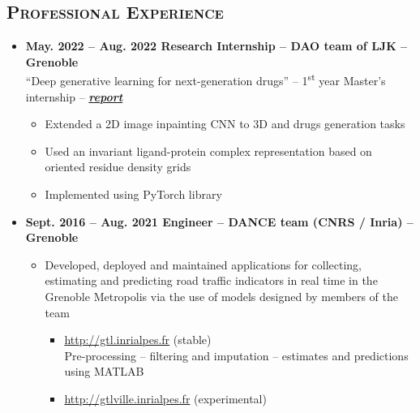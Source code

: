 \documentclass{article}
\begin{document}
\begin{minipage}{0.8\textwidth}
\begin{flushleft}
    \section*{\textsc{Professional Experience}}
    \begin{itemize}
        \item \textbf{May. 2022 – Aug. 2022 \qquad Research Internship – DAO team of LJK – Grenoble} \\
        “Deep generative learning for next-generation drugs” – 1\textsuperscript{st} year Master’s internship – \textbf{\textit{ \hyperlink{https://vadmbertr.github.io/Deep-generative-learning-for-next-generation-drugs/Internship_report___Deep_generative_learning_for_next_generation_drugs.pdf}{report}}}
        \vspace{-.15cm}
        \begin{itemize}[leftmargin=*]
        \setlength\itemsep{.01cm}
            \item Extended a 2D image inpainting CNN to 3D and drugs generation tasks
            \item Used an invariant ligand-protein complex representation based on oriented residue density grids
            \item Implemented using PyTorch library
        \end{itemize}
        \item \textbf{Sept. 2016 – Aug. 2021 \qquad Engineer – DANCE team (CNRS / Inria) – Grenoble}
        \vspace{-.15cm}
        \begin{itemize}[leftmargin=*]
        \setlength\itemsep{.01cm}
            \item Developed, deployed and maintained applications for collecting, estimating and predicting road traffic indicators in real time in the Grenoble Metropolis via the use of models designed by members of the team
            \vspace{-.15cm}
            \begin{itemize}[leftmargin=*]
            \setlength\itemsep{.01cm}
                \item \url{http://gtl.inrialpes.fr} (stable) \\
                Pre-processing – filtering and imputation – estimates and predictions using MATLAB
                \item \url{http://gtlville.inrialpes.fr} (experimental)
                \vspace{-.15cm}
                \begin{itemize}[leftmargin=*]

\end{itemize}
\end{itemize}
\end{itemize}
\end{itemize}
\end{flushleft}
\end{minipage}
\end{document}
